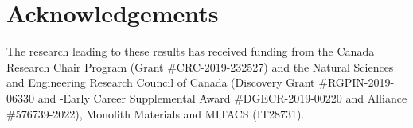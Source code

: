 \section{Acknowledgements}

The research leading to these results has received funding from the Canada Research Chair Program (Grant \#CRC-2019-232527) and the Natural Sciences and Engineering Research Council of Canada (Discovery Grant \#RGPIN-2019-06330 and -Early Career Supplemental Award \#DGECR-2019-00220  and Alliance \#576739-2022), Monolith Materials and MITACS (IT28731).